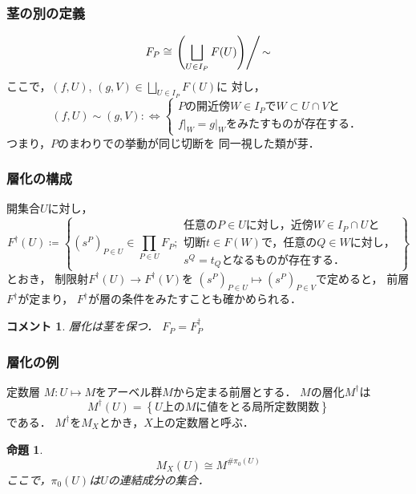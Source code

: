 \documentclass[dvipdfmx,10pt,aspectratio=169,leqno]{beamer}%
\numberwithin{equation}{subsection}
\theoremstyle{mystyle}
\newtheorem{PRP}[AXM]{命題}
\newtheorem{CMT}[AXM]{コメント}
\begin{document}
\begin{frame}
    \frametitle{茎の別の定義}
    \[
        F_{P}\cong
        \left.\left(
            \bigsqcup_{U\in I_P}F(U)
        \right)\right/\mathord{\sim}
    \]
ここで，\((f,U)\), \((g,V)\in \bigsqcup_{U\in I_P}F(U)\)に
対し，\[
    (f,U)\sim(g,V)
    \colon\Longleftrightarrow
    \begin{cases}
        \text{\(P\)の開近傍\(W\in I_P\)で\(W\subset U\cap V\)と}\\
        \text{\(f\rvert_W=g\rvert_W\)をみたすものが存在する．}
    \end{cases}
\]
つまり，\(P\)のまわりでの挙動が同じ切断を
同一視した類が芽．
\end{frame}


\begin{frame}
    \frametitle{層化の構成}

    開集合\(U\)に対し，
    \[
        F^\dagger(U)\coloneqq
        \left\{
            (s^P)_{P\in U}\in\prod_{P\in U}^{}F_P;
            \begin{aligned}
                \text{任意の\(P\in U\)に対し，近傍\(W\in I_P\cap U\)と}\\
                \text{切断\(t\in F(W)\)で，任意の\(Q\in W\)に対し，}\\            
                \text{\(s^Q=t_Q\)となるものが存在する．}            
            \end{aligned}
        \right\}
    \]
    とおき，
    制限射\(F^\dagger(U)\to F^\dagger(V)\)を
    \((s^P)_{P\in U}\mapsto(s^P)_{P\in V}\)で定めると，
    前層\(F^\dagger\)が定まり，
    \(F^\dagger\)が層の条件をみたすことも確かめられる．

    \begin{CMT}層化は茎を保つ．
        \(F_P={F}^{\dagger}_{P}\)
    \end{CMT}
    
\end{frame}

\begin{frame}
    \frametitle{層化の例}

    \begin{exampleblock}{定数層}
        \(M\colon U\mapsto M\)をアーベル群\(M\)から定まる前層とする．
        \(M\)の層化\(M^\dagger\)は\[
            M^\dagger(U)=\left\{
            \text{\(U\)上の\(M\)に値をとる局所定数関数}\right\}
        \]である．
        \(M^\dagger\)を\(M_X\)とかき，\(X\)上の定数層と呼ぶ．
    \end{exampleblock}

    \begin{PRP}
        \[M_X(U)\cong M^{\# \pi_0(U)}\]
        ここで，\(\pi_0(U)\)は\(U\)の連結成分の集合．
    \end{PRP}

\end{frame}
\end{document}
